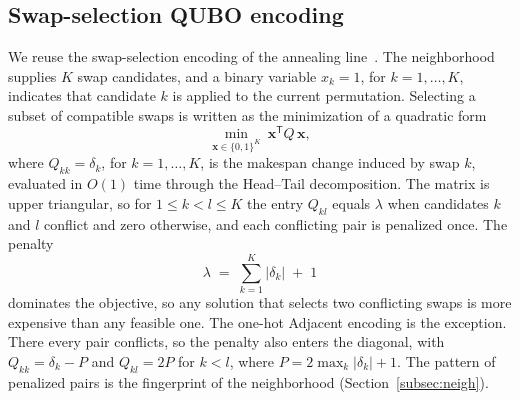 \documentclass{svproc}
\newcommand{\rev}[1]{{\color{blue}#1}}
\newcommand{\rev}[1]{#1}
\begin{document}
\subsection{Swap-selection QUBO encoding}
\label{subsec:qubo}
We reuse the swap-selection encoding of the annealing
line~\rev{\cite{wojewodzki2026windowed}}. The neighborhood supplies $K$ swap
candidates, and a binary variable $x_k=1$, for $k=1,\dots,K$, indicates
that candidate $k$ is applied to the current permutation. Selecting
a subset of compatible swaps is written as the minimization of a
quadratic form
\begin{equation}
  \min_{\mathbf{x}\in\{0,1\}^{K}}\
  \mathbf{x}^{\mathsf T} Q\,\mathbf{x},
  \label{eq:qubo}
\end{equation}
where $Q_{kk}=\delta_k$, for $k=1,\dots,K$, is the makespan change induced
by swap $k$, evaluated in $O(1)$ time through the Head--Tail decomposition.
The matrix is upper triangular, so for $1\le k<l\le K$ the entry $Q_{kl}$
equals $\lambda$ when candidates $k$ and $l$ conflict and zero otherwise, and
each conflicting pair is penalized once. The penalty
\begin{equation}
  \lambda \;=\; \sum_{k=1}^{K}\lvert\delta_k\rvert \;+\; 1
  \label{eq:penalty}
\end{equation}
dominates the objective, so any solution that selects two conflicting
swaps is more expensive than any feasible one. The one-hot Adjacent encoding
is the exception. There every pair conflicts, so the penalty also enters the
diagonal, with $Q_{kk}=\delta_k-P$ and $Q_{kl}=2P$ for $k<l$, where
$P=2\max_{k}\lvert\delta_k\rvert+1$. The pattern of penalized
pairs is the fingerprint of the neighborhood
(Section~\ref{subsec:neigh}).
\end{document}
